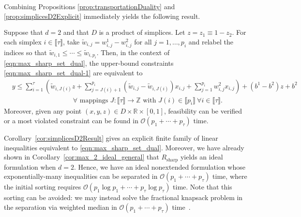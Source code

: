 \documentclass[smallextended]{svjour3}
\newcommand{\tw}{\widetilde{w}}
\newcommand{\Rsharp}{R_{\operatorname{sharp}}}
\begin{document}
Combining Propositions \ref{prop:transportationDuality} and \ref{prop:simplicesD2Explicit} immediately yields the following result.
\begin{corollary} \label{cor:simplicesD2Result}
Suppose that $d=2$ and that $D$ is a product of simplices.  Let $z = z_1 \equiv 1-z_2$.
For each simplex $i \in \llbracket \tau \rrbracket$, take $\tw_{i,j} = w^1_{i,j}-w^2_{i,j}$ for all $j=1,\ldots,p_i$ and relabel the indices so that $\tw_{i,1}\le\cdots\le\tw_{i,p_i}$.
Then, in the context of \eqref{eqn:max_sharp_set_dual}, the upper-bound constraints \eqref{eqn:max_sharp_set_dual-1} are equivalent to
\begin{align}
&y\le\sum_{i=1}^{\tau}\left(\tw_{i,J(i)}z+\sum_{j=J(i)+1}^{p_i}(\tw_{i,j}-\tw_{i,J(i)})x_{i,j}+\sum_{j=1}^{p_i}w^2_{i,j}x_{i,j}\right)+(b^1-b^2)z+b^2 \nonumber \\
&\hspace{9em}\forall\text{ mappings $J:\llbracket\tau\rrbracket\to\mathbb{Z}$ with $J(i)\in\llbracket p_i\rrbracket\ \forall i\in\llbracket\tau\rrbracket$.} \label{eqn:simplicesD2upperBound}
\end{align}
Moreover, given any point $(x,y,z)\in D\times\mathbb{R}\times[0,1]$, feasibility can be verified or a most violated constraint can be found in $\mathcal{O}(p_1+\cdots+p_{\tau})$ time.
\end{corollary}
Corollary~\ref{cor:simplicesD2Result} gives an explicit finite family of linear inequalities equivalent to \eqref{eqn:max_sharp_set_dual}. Moreover, we have already shown in Corollary~\ref{cor:max_2_ideal_general} that $\Rsharp$ yields an ideal formulation when $d=2$. Hence, we have an ideal nonextended formulation whose exponentially-many inequalities can be separated in $\mathcal{O}(p_1+\cdots+p_{\tau})$ time, where the initial sorting requires $\mathcal{O}(p_1\log p_1+\cdots+p_{\tau}\log p_{\tau})$ time. Note that this sorting can be avoided: we may instead solve the fractional knapsack problem in the separation via weighted median in $\mathcal{O}(p_1+\cdots+p_{\tau})$ time~\cite[Chapter 17.1]{Korte:2000}.
\end{document}
